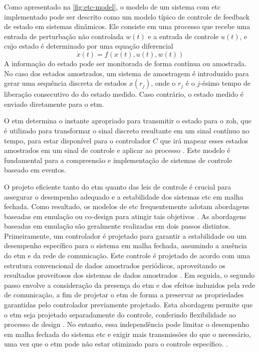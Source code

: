 Como apresentado na \autoref{fig:etc-model}, o modelo de um sistema com \acrshort{etc} implementado pode ser descrito como um modelo típico de controle de feedback de estado em sistemas dinâmicos. Ele consiste em uma processo que recebe uma entrada de perturbação não controlada $w(t)$ e a entrada de controle $u(t)$, e cujo estado é determinado por uma equação diferencial \begin{equation}\dot{x}(t) = f(x(t), u(t), w(t))\end{equation} A informação do estado pode ser monitorada de forma contínua ou amostrada. No caso dos estados amostrados, um sistema de amostragem é introduzido para gerar uma sequência discreta de estados $x(r_j)$, onde o $r_j$ é  o $j$-ésimo tempo de liberação consecutivo do do estado medido. Caso contrário, o estado medido é enviado diretamente para o \acrshort{etm}. \cite{peng2018,coutinho2021,Lemmon2010}

O \acrshort{etm} determina o instante apropriado para transmitir o estado para o \acrfull{zoh}, que é utilizado para transformar o sinal discreto resultante em um sinal contínuo no tempo,  para estar disponível para o controlador $C$ que irá mapear esses estados amostrados em um sinal de controle e aplicar ao processo \cite{coutinho2021}. Este modelo é fundamental para a compreensão e implementação de sistemas de controle baseado em eventos.

O projeto eficiente tanto do \acrshort{etm} quanto das leis de controle é crucial para assegurar o desempenho adequado e a estabilidade dos sistemas \acrshort{etc} em malha fechada. Como resultado, os modelos de \acrshort{etc} frequentemente adotam abordagens baseadas em emulação ou co-design para atingir tais objetivos \cite{coutinho2021, peng2018}. As abordagens baseadas em emulação são geralmente realizadas em dois passos distintos. Primeiramente, um controlador é projetado para garantir a estabilidade ou um desempenho específico para o sistema em malha fechada, assumindo a ausência do \acrshort{etm} e da rede de comunicação. Este controle é projetado de acordo com uma estrutura convencional de dados amostrados periódicos, aproveitando os resultados proveitosos dos sistemas de dados amostrados \cite{coutinho2021,peng2018}. Em seguida, o segundo passo envolve a consideração da presença do \acrshort{etm} e dos efeitos induzidos pela rede de comunicação, a fim de projetar o \acrshort{etm} de forma a preservar as propriedades garantidas pelo controlador previamente projetado. Esta abordagem permite que o \acrshort{etm} seja projetado separadamente do controle, conferindo flexibilidade ao processo de design \cite{coutinho2021,peng2018}. No entanto, essa independência pode limitar o desempenho em malha fechada do sistema \acrshort{etc} e exigir mais transmissões do que o necessário, uma vez que o \acrshort{etm} pode não estar otimizado para o controle específico. \cite{coutinho2021}.

